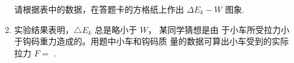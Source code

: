 \begin{enumerate}
\begin{enumerate}
请根据表中的数据，在答题卡的方格纸上作出 $ \Delta E_{k} -W $ 图象.
\begin{figure}[h!]
\centering

\end{figure}

\banswer{
  
}


\item 
实验结果表明，$ \triangle E_{k} $ 总是略小于 $ W $， 某同学猜想是由
于小车所受拉力小于钩码重力造成的。用题中小车和钩码质
量的数据可算出小车受到的实际拉力 $ F= $  .


\end{enumerate}








\end{enumerate}

